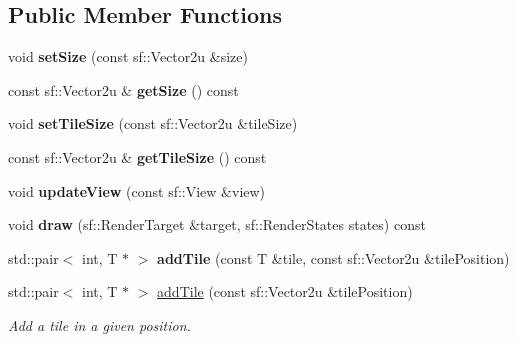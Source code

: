 \subsection*{Public Member Functions}
\begin{DoxyCompactItemize}
\item 
\mbox{\label{classzt_1_1_tilemap_layer_afe899acb9ffba9fba70e0913595f124c}} 
void {\bfseries set\+Size} (const sf\+::\+Vector2u \&size)
\item 
\mbox{\label{classzt_1_1_tilemap_layer_a8990bba160dd50c39a6abcf803bb58e0}} 
const sf\+::\+Vector2u \& {\bfseries get\+Size} () const
\item 
\mbox{\label{classzt_1_1_tilemap_layer_a51c80b285c7128b1ff48f5efe34b302f}} 
void {\bfseries set\+Tile\+Size} (const sf\+::\+Vector2u \&tile\+Size)
\item 
\mbox{\label{classzt_1_1_tilemap_layer_a0711254a5302e3cce7d19f269a48bff7}} 
const sf\+::\+Vector2u \& {\bfseries get\+Tile\+Size} () const
\item 
\mbox{\label{classzt_1_1_tilemap_layer_a18d1e2f04247e83bac25d5ec03870b8b}} 
void {\bfseries update\+View} (const sf\+::\+View \&view)
\item 
\mbox{\label{classzt_1_1_tilemap_layer_a187ec1100dcd2f02eac6f2ba32d1bf4e}} 
void {\bfseries draw} (sf\+::\+Render\+Target \&target, sf\+::\+Render\+States states) const
\item 
\mbox{\label{classzt_1_1_tilemap_layer_a042b846c7958ac5fe1f82250c6cc1d3f}} 
std\+::pair$<$ int, T $\ast$ $>$ {\bfseries add\+Tile} (const T \&tile, const sf\+::\+Vector2u \&tile\+Position)
\item 
std\+::pair$<$ int, T $\ast$ $>$ \hyperlink{classzt_1_1_tilemap_layer_a6fe52aa49bd4965ac7df8a6db0187f5a}{add\+Tile} (const sf\+::\+Vector2u \&tile\+Position)
\begin{DoxyCompactList}\small\item\em Add a tile in a given position. \end{DoxyCompactList}\item 

\end{DoxyCompactItemize}
